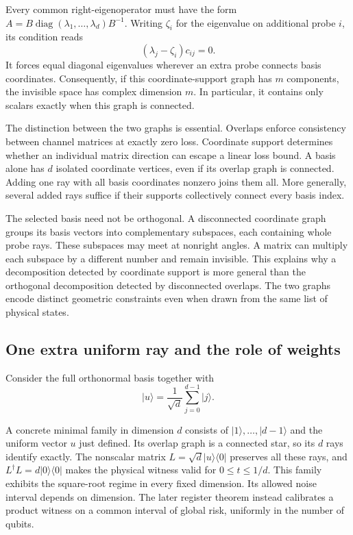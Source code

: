 \documentclass[11pt,a4paper]{article}
\newcommand{\ket}[1]{\lvert #1\rangle}
\newcommand{\bra}[1]{\langle #1\rvert}
\numberwithin{equation}{section}
\begin{document}
Every common right-eigenoperator must have the form $A=B\operatorname{diag}(\lambda_1,\ldots,\lambda_d)B^{-1}$. Writing $\zeta_i$ for the eigenvalue on additional probe $i$, its condition reads
\[
(\lambda_j-\zeta_i)c_{ij}=0.
\]
It forces equal diagonal eigenvalues wherever an extra probe connects basis coordinates. Consequently, if this coordinate-support graph has $m$ components, the invisible space has complex dimension $m$. In particular, it contains only scalars exactly when this graph is connected.

The distinction between the two graphs is essential. Overlaps enforce consistency between channel matrices at exactly zero loss. Coordinate support determines whether an individual matrix direction can escape a linear loss bound. A basis alone has $d$ isolated coordinate vertices, even if its overlap graph is connected. Adding one ray with all basis coordinates nonzero joins them all. More generally, several added rays suffice if their supports collectively connect every basis index.

The selected basis need not be orthogonal. A disconnected coordinate graph groups its basis vectors into complementary subspaces, each containing whole probe rays. These subspaces may meet at nonright angles. A matrix can multiply each subspace by a different number and remain invisible. This explains why a decomposition detected by coordinate support is more general than the orthogonal decomposition detected by disconnected overlaps. The two graphs encode distinct geometric constraints even when drawn from the same list of physical states.

\subsection{One extra uniform ray and the role of weights}

Consider the full orthonormal basis together with
\[
\ket{u}=\frac1{\sqrt d}\sum_{j=0}^{d-1}\ket{j}.
\]

A concrete minimal family in dimension $d$ consists of
$\ket1,\ldots,\ket{d-1}$ and the uniform vector $u$ just defined.
Its overlap graph is a connected star, so its $d$ rays identify exactly.
The nonscalar matrix $L=\sqrt d\ket u\bra0$ preserves all these rays,
and $L^\dagger L=d\ket0\bra0$ makes the physical witness valid for
$0\le t\le1/d$. This family exhibits the square-root regime in every fixed
dimension. Its allowed noise interval depends on dimension. The later
register theorem instead calibrates a product witness on a common interval
of global risk, uniformly in the number of qubits.
\end{document}
